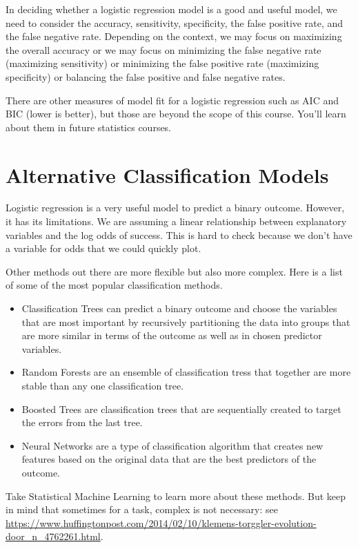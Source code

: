 \documentclass[
]{book}
\begin{document}
In deciding whether a logistic regression model is a good and useful model, we need to consider the accuracy, sensitivity, specificity, the false positive rate, and the false negative rate. Depending on the context, we may focus on maximizing the overall accuracy or we may focus on minimizing the false negative rate (maximizing sensitivity) or minimizing the false positive rate (maximizing specificity) or balancing the false positive and false negative rates.

There are other measures of model fit for a logistic regression such as AIC and BIC (lower is better), but those are beyond the scope of this course. You'll learn about them in future statistics courses.

\hypertarget{alternative-classification-models}{%
\section{Alternative Classification Models}\label{alternative-classification-models}}

Logistic regression is a very useful model to predict a binary outcome. However, it has its limitations. We are assuming a linear relationship between explanatory variables and the log odds of success. This is hard to check because we don't have a variable for odds that we could quickly plot.

Other methods out there are more flexible but also more complex. Here is a list of some of the most popular classification methods.

\begin{itemize}
\item
  Classification Trees can predict a binary outcome and choose the variables that are most important by recursively partitioning the data into groups that are more similar in terms of the outcome as well as in chosen predictor variables.
\item
  Random Forests are an ensemble of classification tress that together are more stable than any one classification tree.
\item
  Boosted Trees are classification trees that are sequentially created to target the errors from the last tree.
\item
  Neural Networks are a type of classification algorithm that creates new features based on the original data that are the best predictors of the outcome.
\end{itemize}

Take Statistical Machine Learning to learn more about these methods. But keep in mind that sometimes for a task, complex is not necessary: see \url{https://www.huffingtonpost.com/2014/02/10/klemens-torggler-evolution-door_n_4762261.html}.
\end{document}
